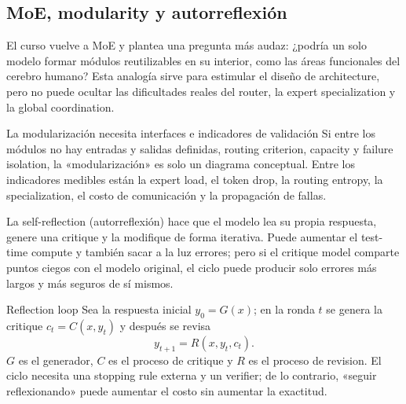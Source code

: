 \subsection{MoE, modularity y autorreflexión}

El curso vuelve a MoE y plantea una pregunta más audaz: ¿podría un solo modelo formar módulos reutilizables en su interior, como las áreas funcionales del cerebro humano? Esta analogía sirve para estimular el diseño de architecture, pero no puede ocultar las dificultades reales del router, la expert specialization y la global coordination.



\begin{warningbox}{La modularización necesita interfaces e indicadores de validación}
Si entre los módulos no hay entradas y salidas definidas, routing criterion, capacity y failure isolation, la «modularización» es solo un diagrama conceptual. Entre los indicadores medibles están la expert load, el token drop, la routing entropy, la specialization, el costo de comunicación y la propagación de fallas.
\end{warningbox}

La self-reflection (autorreflexión) hace que el modelo lea su propia respuesta, genere una critique y la modifique de forma iterativa. Puede aumentar el test-time compute y también sacar a la luz errores; pero si el critique model comparte puntos ciegos con el modelo original, el ciclo puede producir solo errores más largos y más seguros de sí mismos.



\begin{importantbox}{Reflection loop}
Sea la respuesta inicial $y_0=G(x)$; en la ronda $t$ se genera la critique $c_t=C(x,y_t)$ y después se revisa
\[
y_{t+1}=R(x,y_t,c_t).
\]
$G$ es el generador, $C$ es el proceso de critique y $R$ es el proceso de revision. El ciclo necesita una stopping rule externa y un verifier; de lo contrario, «seguir reflexionando» puede aumentar el costo sin aumentar la exactitud.
\end{importantbox}

